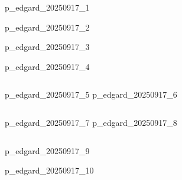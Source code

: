 \begin{frame}
    \titlepage
\end{frame}

{\nologo
\begin{frame}
    {p_edgard_20250917_1}
\end{frame}
}

{\nologo
\begin{frame}
    {p_edgard_20250917_2}
\end{frame}
}

{\nologo
\begin{frame}
    {p_edgard_20250917_3}
\end{frame}
}

{\nologo
\begin{frame}
    {p_edgard_20250917_4}
\end{frame}
}

{\nologo
\begin{frame}
    \begin{columns}
            {p_edgard_20250917_5}
            {p_edgard_20250917_6}
    \end{columns}
\end{frame}
}

{\nologo
\begin{frame}
    \begin{columns}
            {p_edgard_20250917_7}
            {p_edgard_20250917_8}
    \end{columns}
\end{frame}
}

{\nologo
\begin{frame}
    {p_edgard_20250917_9}
\end{frame}
}

{\nologo
\begin{frame}
    {p_edgard_20250917_10}
\end{frame}
}
